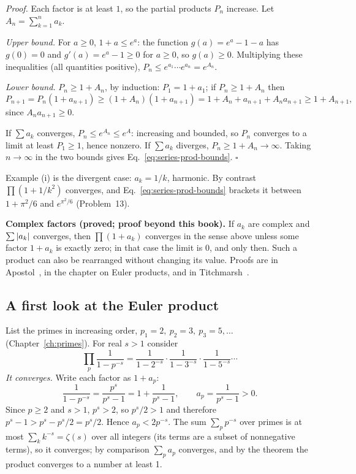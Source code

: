 \emph{Proof.} Each factor is at least $1$, so the partial products $P_n$ increase. Let $A_n=\sum_{k=1}^na_k$.

\emph{Upper bound.} For $a\ge0$, $1+a\le e^a$: the function $g(a)=e^a-1-a$ has $g(0)=0$ and $g'(a)=e^a-1\ge0$ for $a\ge0$, so $g(a)\ge0$. Multiplying these inequalities (all quantities positive), $P_n\le e^{a_1}\cdots e^{a_n}=e^{A_n}$.

\emph{Lower bound.} $P_n\ge1+A_n$, by induction: $P_1=1+a_1$; if $P_n\ge1+A_n$ then
\[
P_{n+1}=P_n(1+a_{n+1})\ge(1+A_n)(1+a_{n+1})=1+A_n+a_{n+1}+A_na_{n+1}\ge1+A_{n+1},
\]
since $A_na_{n+1}\ge0$.

If $\sum a_k$ converges, $P_n\le e^{A_n}\le e^{A}$: increasing and bounded, so $P_n$ converges to a limit at least $P_1\ge1$, hence nonzero. If $\sum a_k$ diverges, $P_n\ge1+A_n\to\infty$. Taking $n\to\infty$ in the two bounds gives Eq.~\eqref{eq:series-prod-bounds}. $\square$

Example (i) is the divergent case: $a_k=1/k$, harmonic. By contrast $\prod(1+1/k^2)$ converges, and Eq.~\eqref{eq:series-prod-bounds} brackets it between $1+\pi^2/6$ and $e^{\pi^2/6}$ (Problem~13).

\begin{beyond}
\textbf{Complex factors (proved; proof beyond this book).} If $a_k$ are complex and $\sum\left\lvert a_k\right\rvert$ converges, then $\prod(1+a_k)$ converges in the sense above unless some factor $1+a_k$ is exactly zero; in that case the limit is $0$, and only then. Such a product can also be rearranged without changing its value. Proofs are in Apostol~\cite{apostol}, in the chapter on Euler products, and in Titchmarsh~\cite{titchmarsh}.
\end{beyond}

\subsection{A first look at the Euler product}

List the primes in increasing order, $p_1=2,\ p_2=3,\ p_3=5,\dots$ (Chapter~\ref{ch:primes}). For real $s>1$ consider
\begin{equation}
\prod_{p}\frac1{1-p^{-s}}=\frac1{1-2^{-s}}\cdot\frac1{1-3^{-s}}\cdot\frac1{1-5^{-s}}\cdots
\label{eq:series-euler-preview}
\end{equation}
\emph{It converges.} Write each factor as $1+a_p$:
\[
\frac1{1-p^{-s}}=\frac{p^s}{p^s-1}=1+\frac{1}{p^s-1},\qquad a_p=\frac1{p^s-1}>0 .
\]
Since $p\ge2$ and $s>1$, $p^s>2$, so $p^s/2>1$ and therefore $p^s-1>p^s-p^s/2=p^s/2$. Hence $a_p<2p^{-s}$. The sum $\sum_p p^{-s}$ over primes is at most $\sum_k k^{-s}=\zeta(s)$ over all integers (its terms are a subset of nonnegative terms), so it converges; by comparison $\sum_pa_p$ converges, and by the theorem the product converges to a number at least 1.

